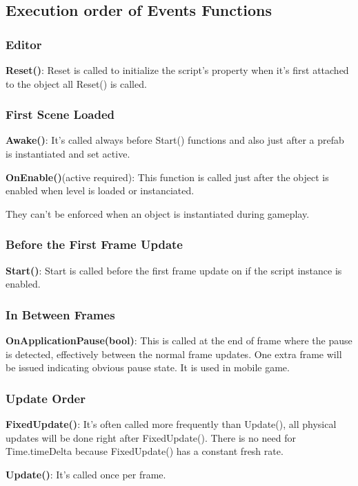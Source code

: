 \documentclass[10pt, a4paper]{article}
\begin{document}
        \subsection{Execution order of Events Functions}
            \subsubsection{Editor}
                \textbf{Reset()}: Reset is called to initialize the script's property when it's first attached to the object all Reset() is called. 
            \subsubsection{First Scene Loaded}
                \textbf{Awake()}: It's called always before Start() functions and also just after a prefab is instantiated and set active.

                \textbf{OnEnable()}(active required): This function is called just after the object is enabled when level is loaded or instanciated. 

                They can't be enforced when an object is instantiated during gameplay. 
            \subsubsection{Before the First Frame Update}
                \textbf{Start()}: Start is called before the first frame update on if the script instance is enabled. 
                
            \subsubsection{In Between Frames}
                \textbf{OnApplicationPause(bool)}: This is called at the end of frame where the pause is detected, effectively between the normal frame updates. One extra frame will be issued indicating obvious pause state. It is used in mobile game. 
            \subsubsection{Update Order}
                \textbf{FixedUpdate()}: It's often called more frequently than Update(), all physical updates will be done right after FixedUpdate(). There is no need for Time.timeDelta because FixedUpdate() has a constant fresh rate. 

                \textbf{Update()}: It's called once per frame. 
\end{document}
